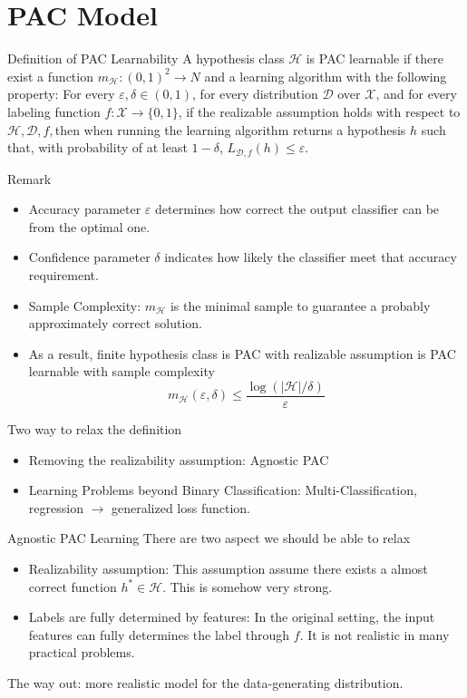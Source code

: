 \documentclass{beamer}
\begin{document}
\section{PAC Model}
\begin{frame}{Definition of PAC Learnability}
	A hypothesis class $\mathcal{H}$ is PAC learnable if there exist a function $m_{\mathcal{H}}: (0,1)^2 \rightarrow N$ and a learning algorithm with the following property: For every $\varepsilon, \delta \in (0,1)$, for every distribution $\mathcal{D}$ over $\mathcal{X}$, and for every labeling function $f: \mathcal{X} \rightarrow \{0,1\}$, if the realizable assumption holds with respect to $\mathcal{H},\mathcal{D},f,$then when running the learning algorithm returns a hypothesis $h$ such that, with probability of at least $1-\delta$, $L_{\mathcal{D},f}(h) \leq \varepsilon$. \\
\end{frame}
\begin{frame}{Remark}
	\begin{itemize}
	\item Accuracy parameter $\varepsilon$ determines how correct the output classifier can be from the optimal one.
	\item Confidence parameter $\delta$ indicates how likely the classifier meet that accuracy requirement.
	\item Sample Complexity: $m_{\mathcal{H}}$ is the minimal sample to guarantee a probably approximately correct solution.
	\item As a result, finite hypothesis class is PAC with realizable assumption is PAC learnable with sample complexity 
		\[m_{\mathcal{H}}(\varepsilon,\delta) \leq \frac{\log(|\mathcal{H}|/\delta)}{\varepsilon}\]
	\end{itemize}
\end{frame}
\begin{frame}{Two way to relax the definition}
	\begin{itemize}
			\item Removing the realizability assumption: Agnostic PAC
			\item Learning Problems beyond Binary Classification: Multi-Classification, regression $\rightarrow$ generalized loss function.
	\end{itemize}

\end{frame}
\begin{frame}{Agnostic PAC Learning}
	There are two aspect we should be able to relax
	\begin{itemize}
		\item Realizability assumption: This assumption assume there exists a almost correct function $h^* \in \mathcal{H}$. This is somehow very strong. 
		\item Labels are fully determined by features: In the original setting, the input features can fully determines the label through $f$. It is not realistic in many practical problems.
	\end{itemize}
	The way out: more realistic model for the data-generating distribution. 

\end{frame}
\end{document}
